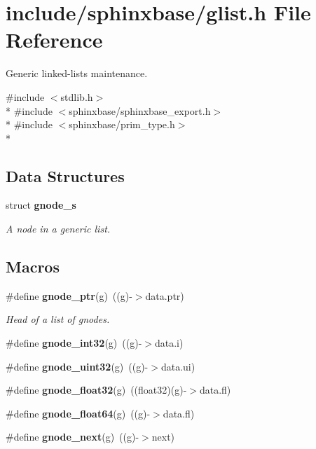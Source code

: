 \section{include/sphinxbase/glist.h File Reference}
\label{glist_8h}


Generic linked-\/lists maintenance.  


{\ttfamily \#include $<$stdlib.\+h$>$}\\*
{\ttfamily \#include $<$sphinxbase/sphinxbase\+\_\+export.\+h$>$}\\*
{\ttfamily \#include $<$sphinxbase/prim\+\_\+type.\+h$>$}\\*
\subsection*{Data Structures}
\begin{DoxyCompactItemize}
\item 
struct {\bf gnode\+\_\+s}
\begin{DoxyCompactList}\small\item\em A node in a generic list. \end{DoxyCompactList}\end{DoxyCompactItemize}
\subsection*{Macros}
\begin{DoxyCompactItemize}
\item 
\#define {\bf gnode\+\_\+ptr}(g)~((g)-\/$>$data.\+ptr)
\begin{DoxyCompactList}\small\item\em Head of a list of gnodes. \end{DoxyCompactList}\item 
\#define {\bfseries gnode\+\_\+int32}(g)~((g)-\/$>$data.\+i)\label{glist_8h_a7daab0205c40d1b449529ee4cc54522b}

\item 
\#define {\bfseries gnode\+\_\+uint32}(g)~((g)-\/$>$data.\+ui)\label{glist_8h_a3af0cc8d5d612e85fa433ac3edf42fd6}

\item 
\#define {\bfseries gnode\+\_\+float32}(g)~((float32)(g)-\/$>$data.\+fl)\label{glist_8h_aaf6a2bdc69642303426c20fc0bdfa5f6}

\item 
\#define {\bfseries gnode\+\_\+float64}(g)~((g)-\/$>$data.\+fl)\label{glist_8h_abfea8eee77afc1e3046ef33ae6c0f5b4}

\item 
\#define {\bfseries gnode\+\_\+next}(g)~((g)-\/$>$next)\label{glist_8h_a33fc794db097ba2a5a36eba12c418993}

\end{DoxyCompactItemize}

